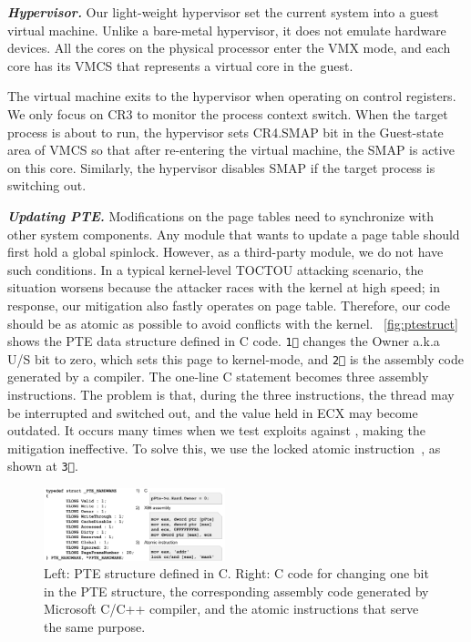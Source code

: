 \textbf{\textit{Hypervisor.}} Our light-weight hypervisor set the current system into a guest virtual machine. Unlike a bare-metal hypervisor, it does not emulate hardware devices. All the cores on the physical processor enter the VMX mode, and each core has its VMCS that represents a virtual core in the guest.


The virtual machine exits to the hypervisor when operating on control registers. We only focus on CR3 to monitor the process context switch. When the target process is about to run, the hypervisor sets CR4.SMAP bit in the Guest-state area of VMCS so that after re-entering the virtual machine, the SMAP is active on this core. Similarly, the hypervisor disables SMAP if the target process is switching out.


\textbf{\textit{Updating PTE.}}
Modifications on the page tables need to synchronize with other system components. Any module that wants to update a page table should first hold a global spinlock. However, as a third-party module, we do not have such conditions. In a typical kernel-level TOCTOU attacking scenario, the situation worsens because the attacker races with the kernel at high speed; in response, our mitigation also fastly operates on page table. Therefore, our code should be as atomic as possible to avoid conflicts with the kernel. ~\autoref{fig:ptestruct} shows the PTE data structure defined in C code. \texttt{\textcircled{1}} changes the Owner a.k.a U/S bit to zero, which sets this page to kernel-mode, and \texttt{\textcircled{2}} is the assembly code generated by a compiler. The one-line C statement becomes three assembly instructions. The problem is that, during the three instructions, the thread may be interrupted and switched out, and the value held in ECX may become outdated. It occurs many times when we test exploits against \name, making the mitigation ineffective. To solve this, we use the locked atomic instruction~\cite{intelmanualchapter8}, as shown at \texttt{\textcircled{3}}.

\begin{figure}[th]
  \includegraphics[width=0.47\textwidth]{figures/ptestructcode}
  \centering
  \caption{Left: PTE structure defined in C. Right: C code for changing one bit in the PTE structure, the corresponding assembly code generated by Microsoft C/C++ compiler, and the atomic instructions that serve the same purpose.}
  \label{fig:ptestruct}
\end{figure}


